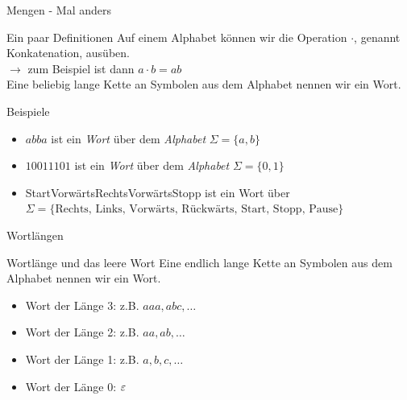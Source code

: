 \begin{frame}[fragile]{Mengen - Mal anders}
    \begin{alertblock}{Ein paar Definitionen}
    Auf einem Alphabet können wir die Operation $\cdot$\;, genannt \alert{Konkatenation}, ausüben.\\
    $\rightarrow$ zum Beispiel ist dann $a \cdot b = ab$\\
    Eine beliebig lange Kette an Symbolen aus dem Alphabet nennen wir ein \alert{Wort}.
    \end{alertblock}
    \begin{exampleblock}{Beispiele}
    \begin{itemize}
        \item $abba$ ist ein \emph{Wort} über dem \emph{Alphabet} $\Sigma = \{a,b\}$
        \item $10011101$ ist ein \emph{Wort} über dem \emph{Alphabet} $\Sigma = \{0,1\}$
        \item StartVorwärtsRechtsVorwärtsStopp ist ein Wort über $\Sigma = \{\text{Rechts, Links, Vorwärts, Rückwärts, Start, Stopp, Pause}\}$
    \end{itemize}
    
    \end{exampleblock}
\end{frame}

\begin{frame}{Wortlängen}
    \begin{alertblock}{Wortlänge und das leere Wort}
        Eine endlich lange Kette an Symbolen aus dem Alphabet nennen wir ein Wort.
    \end{alertblock}
    \begin{itemize}
        \item Wort der Länge 3: z.B. $aaa, abc, \dots$
        \item Wort der Länge 2: z.B. $aa, ab, \dots$
        \item Wort der Länge 1: z.B. $a, b, c, \dots$
        \item Wort der Länge \alert<2>{0}: \alert<2>{$\varepsilon$}
    \end{itemize}
\end{frame}


